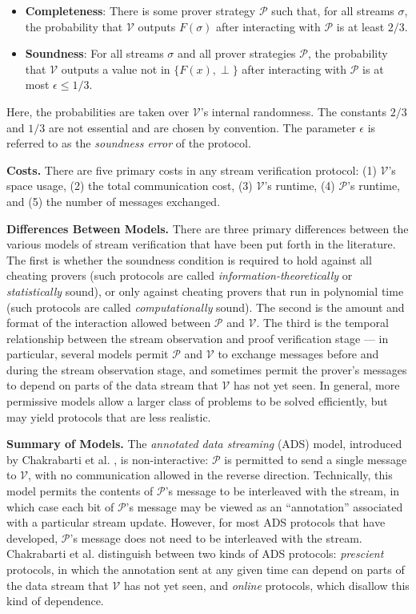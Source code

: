 \documentclass[11pt, letterpaper]{article}
\newcommand{\stream}{{\sigma}}
\newcommand{\cV}{\mathcal{V}}
\newcommand{\cP}{\mathcal{P}}
\newcommand{\eps}{\epsilon}
\begin{document}
\begin{itemize}
\item \textbf{Completeness}: There is some prover strategy $\cP$ such that, for all streams $\stream$, the probability that $\cV$ outputs $F(\stream)$ after interacting with $\cP$ is at least $2/3$. 
\item \textbf{Soundness}: For all streams $\stream$ and all prover strategies $\cP$, the probability that $\cV$ outputs a value not in $\{F(x), \perp\}$ after interacting with $\cP$ is at most $\eps \leq 1/3$.
\end{itemize}

Here, the probabilities are taken over $\cV$'s internal randomness. The constants $2/3$ and $1/3$ are not essential and are chosen by convention. The parameter
$\eps$ is referred to as the \emph{soundness error} of the protocol.

\medskip
\noindent \textbf{Costs.}
There are five primary costs in any stream verification protocol: (1) $\cV$'s space usage, (2) the total communication cost, (3) $\cV$'s runtime, (4) $\cP$'s runtime, and (5) the number of messages exchanged. 

\medskip
\noindent \textbf{Differences Between Models.}
There are three primary differences between the various models of stream verification that have been put forth in the literature. The first is whether the soundness condition is required to hold against all cheating provers (such protocols are called \emph{information-theoretically} or \emph{statistically} sound), or only against cheating provers that run in polynomial time (such protocols are called \emph{computationally} sound). The second is the amount and format of the interaction allowed between $\cP$ and $\cV$.  The third is the temporal relationship between the stream observation and proof verification stage --- in particular, several models permit $\cP$ and $\cV$ to exchange messages before and during the stream observation stage, and sometimes permit the prover's messages to depend on parts of the data stream that $\cV$ has not yet seen. 
In general, more permissive models allow a larger class of problems to be solved efficiently, but may yield protocols that are less realistic.

\medskip
\noindent \textbf{Summary of Models.}
The \emph{annotated data streaming} (ADS) model, introduced by Chakrabarti et al. \cite{icalp}, is non-interactive: $\cP$ is permitted to send a single message to $\cV$, with no communication allowed in the reverse direction. Technically, this model permits the contents of $\cP$'s message to be interleaved with the stream, in which case each bit of $\cP$'s message may be viewed as an ``annotation'' associated with a particular stream update. However, for most ADS protocols that have developed, $\cP$'s message does not need to be interleaved with the stream.
Chakrabarti et al. \cite{icalp} distinguish between two kinds of ADS protocols: \emph{prescient} protocols, in which the annotation sent at any given time can depend on parts of the data stream that $\cV$ has not yet seen, and \emph{online} protocols, which disallow this kind of dependence.
\end{document}
